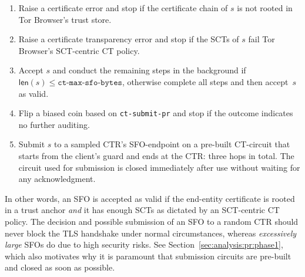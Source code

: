 \begin{enumerate}
	\item Raise a certificate error and stop if the certificate chain of $s$
		is not rooted in Tor Browser's trust store.
	\item Raise a certificate transparency error and stop if the SCTs of $s$
		fail Tor Browser's SCT-centric CT policy.
	\item Accept $s$ and conduct the remaining steps in the background if
		$\mathsf{len}(s) \le \texttt{ct-max-sfo-bytes}$, otherwise complete
		all steps and then accept~$s$ as valid.
	\item Flip a biased coin based on \texttt{ct-submit-pr} and stop if the
		outcome indicates no further auditing.
	\item Submit $s$ to a sampled CTR's SFO-endpoint on a pre-built CT-circuit
		that starts from the client's guard and ends at the CTR: three hops in
		total.  The circuit used for submission is closed immediately after
		use without waiting for any acknowledgment.
\end{enumerate}

In other words, an SFO is accepted as valid if the end-entity certificate is
rooted in a trust anchor \emph{and} it has enough SCTs as dictated by an
SCT-centric CT policy.  The decision and possible submission of an SFO to a
random CTR should never block the TLS handshake under normal circumstances,
whereas \emph{excessively large} SFOs do due to high security risks.  See
Section~\ref{sec:analysis:pr:phase1}, which also motivates why it is paramount
that submission circuits are pre-built and closed as soon as possible.

%
%

